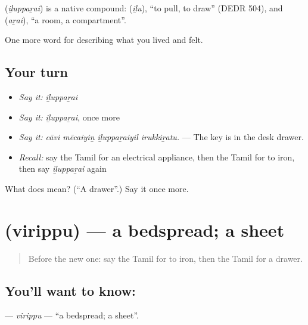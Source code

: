 \begin{cousinweb}
\textbf{} (\emph{iḻuppaṟai}) is a native compound:  (\emph{iḻu}), \textquotedblleft{}to pull, to draw\textquotedblright{} (DEDR 504), and  (\emph{aṟai}), \textquotedblleft{}a room, a compartment\textquotedblright{}.
\end{cousinweb}

\begin{grammarlens}[title={What you've built}]
One more word for describing what you lived and felt.
\end{grammarlens}

\subsection*{Your turn}
\begin{itemize}
\raggedright
  \item \emph{Say it:} \emph{iḻuppaṟai}
  \item \emph{Say it:} \emph{iḻuppaṟai}, once more
  \item \emph{Say it:} \emph{cāvi mēcaiyiṉ iḻuppaṟaiyil irukkiṟatu.} — The key is in the desk drawer.
  \item \emph{Recall:} say the Tamil for an electrical appliance, then the Tamil for to iron, then say \emph{iḻuppaṟai} again
\end{itemize}

\begin{tcolorbox}[breakable,colback=teal!4,colframe=teal!35!black,title={Before you move on}]
What does  mean? (\textquotedblleft{}A drawer\textquotedblright{}.) Say it once more.
\end{tcolorbox}
\section[\texorpdfstring{\ta{விரிப்பு} (virippu)}{விரிப்பு (virippu)}]{ (virippu) — a bedspread; a sheet}

\label{lesson:TA-C521-virippu}



\begin{quote}
Before the new one: say the Tamil for to iron, then the Tamil for a drawer.
\end{quote}

\subsection*{You'll want to know: }
\textbf{} — \emph{virippu} — \textquotedblleft{}a bedspread; a sheet\textquotedblright{}.

